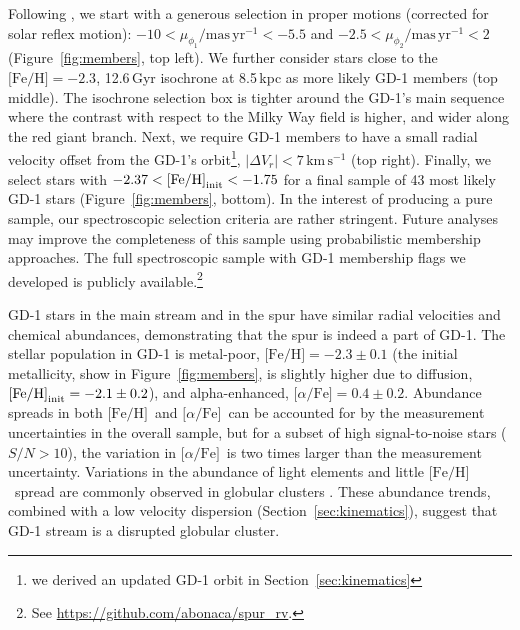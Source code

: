 \documentclass[twocolumn]{aastex63}
\newcommand{\kms}{\ensuremath{\textrm{km}\,\textrm{s}^{-1}}}
\newcommand{\masyr}{\ensuremath{\textrm{mas}\,\textrm{yr}^{-1}}}
\newcommand{\feh}{\ensuremath{\textrm{[Fe/H]}}}
\newcommand{\afe}{\ensuremath{\textrm{[$\alpha$/Fe]}}}
\begin{document}
Following \citet{pwb}, we start with a generous selection in proper motions (corrected for solar reflex motion): $-10<\mu_{\phi_1}/\masyr<-5.5$ and $-2.5<\mu_{\phi_2}/\masyr<2$ (Figure~\ref{fig:members}, top left).
We further consider stars close to the $\textrm{[Fe/H]}=-2.3$, 12.6\,Gyr isochrone at 8.5\,kpc \citep{choi2016} as more likely GD-1 members (top middle).
The isochrone selection box is tighter around the GD-1's main sequence where the contrast with respect to the Milky Way field is higher, and wider along the red giant branch.
Next, we require GD-1 members to have a small radial velocity offset from the GD-1's orbit\footnote{we derived an updated GD-1 orbit in Section~\ref{sec:kinematics}}, $|\Delta V_r| < 7\,\kms$ (top right).
Finally, we select stars with $-2.37<\feh_{\rm init}<-1.75$ for a final sample of 43 most likely GD-1 stars (Figure~\ref{fig:members}, bottom).
In the interest of producing a pure sample, our spectroscopic selection criteria are rather stringent.
Future analyses may improve the completeness of this sample using probabilistic membership approaches.
The full spectroscopic sample with GD-1 membership flags we developed is publicly available.\footnote{See \url{https://github.com/abonaca/spur_rv}.}

GD-1 stars in the main stream and in the spur have similar radial velocities and chemical abundances, demonstrating that the spur is indeed a part of GD-1.
The stellar population in GD-1 is metal-poor, $\feh=-2.3\pm0.1$ (the initial metallicity, show in Figure~\ref{fig:members}, is slightly higher due to diffusion, $\feh_{\rm init}=-2.1\pm0.2$), and alpha-enhanced, $\afe=0.4\pm0.2$.
Abundance spreads in both \feh\ and \afe\ can be accounted for by the measurement uncertainties in the overall sample, but for a subset of high signal-to-noise stars ($S/N>10$), the variation in \afe\ is two times larger than the measurement uncertainty.
Variations in the abundance of light elements and little \feh\ spread are commonly observed in globular clusters \citep{gratton2019}.
These abundance trends, combined with a low velocity dispersion (Section~\ref{sec:kinematics}), suggest that GD-1 stream is a disrupted globular cluster.

\end{document}
